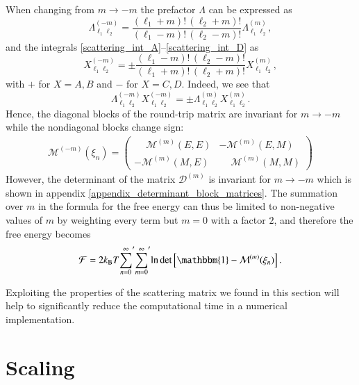 When changing from $m\to-m$ the prefactor $\Lambda$ can be expressed as
\begin{equation}
\label{eq:4_lamdamm}
\Lambda_{\ell_1 \ell_2}^{(-m)} = \frac{(\ell_1+m)!\,(\ell_2+m)!}{(\ell_1-m)!\,(\ell_2-m)!} \Lambda_{\ell_1 \ell_2}^{(m)},
\end{equation}
and the integrals \eqref{scattering_int_A}--\eqref{scattering_int_D} as
\begin{equation}
\label{eq:4_mm}
X_{\ell_1 \ell_2}^{(-m)} = \pm \frac{(\ell_1-m)!\,(\ell_2-m)!}{(\ell_1+m)!\,(\ell_2+m)!} X_{\ell_1 \ell_2}^{(m)},
\end{equation}
with $+$ for $X=A,B$ and $-$ for $X=C,D$. Indeed, we see that
\begin{equation}
\Lambda_{\ell_1 \ell_2}^{(-m)} X_{\ell_1 \ell_2}^{(-m)} = \pm \Lambda_{\ell_1 \ell_2}^{(m)} X_{\ell_1 \ell_2}^{(m)}.
\end{equation}
Hence, the diagonal blocks of the round-trip matrix are invariant for $m\to-m$
while the nondiagonal blocks change sign:
\begin{align}
\mathcal{M}^{(-m)}(\xi_n) = \left(\begin{array}{cc}
   \phantom{-}\mathcal{M}^{(m)}(E,E) &           -\mathcal{M}^{(m)}(E,M) \\
             -\mathcal{M}^{(m)}(M,E) & \phantom{-}\mathcal{M}^{(m)}(M,M)
\end{array}\right)
\end{align}
However, the determinant of the matrix $\mathcal{D}^{(m)}$ is invariant for
$m\to-m$ which is shown in appendix \ref{appendix_determinant_block_matrices}.
The summation over $m$ in the formula for the free energy can thus be limited
to non-negative values of $m$ by weighting every term but $m=0$ with a factor
$2$, and therefore the free energy becomes
\begin{equation}
\label{eq:4_Fk}
\mathcal{F} = 2\kb T {\sum_{n=0}^\infty}^\prime {\sum_{m=0}^\infty}^\prime \log\det \left[ \mathbbm{1} - \mathcal{M}^{(m)}(\xi_n)\right].
\end{equation}

Exploiting the properties of the scattering matrix we found in this section
will help to significantly reduce the computational time in a numerical
implementation.


\section{Scaling}

\label{scattering_ps_scaling}

